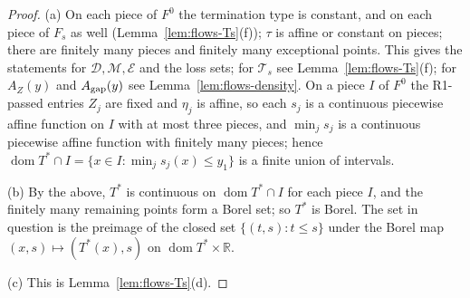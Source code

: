 \documentclass[11pt]{amsart}
\newcommand{\R}{\mathbb R}
\newcommand{\cE}{\mathcal E}
\newcommand{\Fz}{F^{0}}
\newcommand{\Fs}{F_{s}}
\newcommand{\Tstar}{T^{*}}
\theoremstyle{definition}
\theoremstyle{remark}
\numberwithin{equation}{section}
\begin{document}
\begin{proof}
(a) On each piece of $\Fz$ the termination type is constant, and on each piece of $\Fs$ as well
(Lemma~\ref{lem:flows-Ts}(f)); $\tau$ is affine or constant on pieces; there are finitely many pieces and finitely many
exceptional points. This gives the statements for $\mathcal D,\mathcal M,\cE$ and the loss sets; for $\mathcal T_s$ see
Lemma~\ref{lem:flows-Ts}(f); for $A_Z(y)$ and $A_{\rm gap}(y)$ see Lemma~\ref{lem:flows-density}. On a piece $I$ of $\Fz$
the R1-passed entries $Z_j$ are fixed and $\eta_j$ is affine, so each $s_j$ is a continuous piecewise affine function on
$I$ with at most three pieces, and $\min_js_j$ is a continuous piecewise affine function with finitely many pieces; hence $\operatorname{dom}\Tstar\cap I=\{x\in I:\min_js_j(x)\le y_1\}$
is a finite union of intervals.

(b) By the above, $\Tstar$ is continuous on $\operatorname{dom}\Tstar\cap I$ for each piece $I$, and the finitely many
remaining points form a Borel set; so $\Tstar$ is Borel. The set in question is the preimage of the closed set
$\{(t,s):t\le s\}$ under the Borel map $(x,s)\mapsto(\Tstar(x),s)$ on $\operatorname{dom}\Tstar\times\R$.

(c) This is Lemma~\ref{lem:flows-Ts}(d).


\end{proof}
\end{document}
